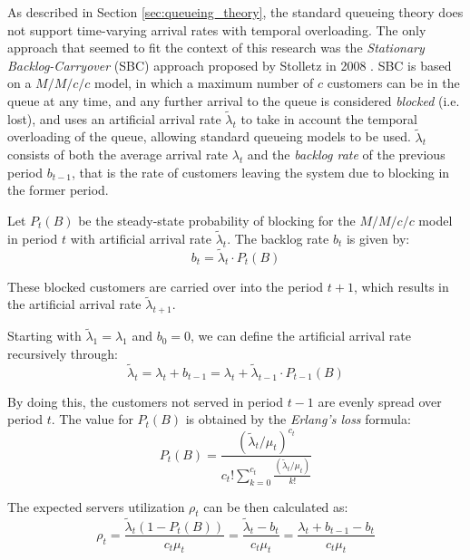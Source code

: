 As described in Section \ref{sec:queueing_theory}, the standard queueing theory does not support time-varying arrival rates with temporal overloading. The only approach that seemed to fit the context of this research was the \emph{Stationary Backlog-Carryover} (SBC) approach proposed by Stolletz in 2008 \cite{stolletz}. SBC is based on a \( M/M/c/c \) model, in which a maximum number of \( c \) customers can be in the queue at any time, and any further arrival to the queue is considered \emph{blocked} (i.e. lost), and uses an artificial arrival rate \( \widetilde{\lambda}_t \) to take in account the temporal overloading of the queue, allowing standard queueing models to be used. \( \widetilde{\lambda}_t \) consists of both the average arrival rate \( \lambda_t \) and the \emph{backlog rate} of the previous period \( b_{t-1} \), that is the rate of customers leaving the system due to blocking in the former period.

Let \( P_t(B) \) be the steady-state probability of blocking for the \( M/M/c/c \) model in period \( t \) with artificial arrival rate \( \widetilde{\lambda}_t \). The backlog rate \( b_t \) is given by:
\begin{equation}
  b_t = \widetilde{\lambda}_t \cdot P_t(B)
\end{equation}

These blocked customers are carried over into the period \( t+1 \), which results in the artificial arrival rate \( \widetilde{\lambda}_{t+1} \).

Starting with \( \widetilde{\lambda}_1 = \lambda_1 \) and \( b_0 = 0 \), we can define the artificial arrival rate recursively through:
\begin{equation}
  \widetilde{\lambda}_t = \lambda_t + b_{t-1} = \lambda_t + \widetilde{\lambda}_{t-1} \cdot P_{t-1}(B)
\end{equation}

By doing this, the customers not served in period \( t-1 \) are evenly spread over period \( t \). The value for \( P_t(B) \) is obtained by the \emph{Erlang’s loss} formula:
\begin{equation}
  P_t(B) = \frac{(\widetilde{\lambda}_t / \mu_t)^{c_t}}{c_t!\sum_{k=0}^{c_t} \frac{(\widetilde{\lambda}_t / \mu_t)}{k!}}
\end{equation}

The expected servers utilization \( \rho_t \) can be then calculated as:
\begin{equation}
  \rho_t = \frac{\widetilde{\lambda}_t(1 - P_t(B))}{c_t\mu_t} = \frac{\widetilde{\lambda}_t - b_t}{c_t\mu_t} = \frac{\lambda_t + b_{t-1} - b_t}{c_t\mu_t}
  \label{eq:2}
\end{equation}

